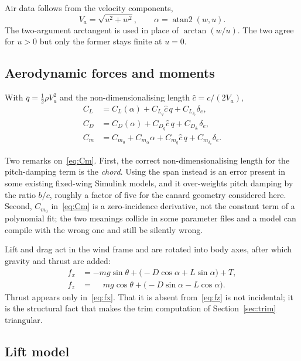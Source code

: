 \documentclass[11pt,a4paper]{article}
\newcommand{\de}{\delta_e}
\begin{document}
Air data follows from the velocity components,
\begin{equation}
  V_a = \sqrt{u^2+w^2}, \qquad \alpha = \operatorname{atan2}(w,u).
  \label{eq:airdata}
\end{equation}
The two-argument arctangent is used in place of $\arctan(w/u)$. The two agree for
$u>0$ but only the former stays finite at $u=0$.

\subsection{Aerodynamic forces and moments}

With $\bar q = \tfrac12\rho V_a^2$ and the non-dimensionalising length
$\hat c = c/(2V_a)$,
\begin{align}
  C_L &= C_{L}(\alpha) + C_{L_q}\hat c\, q + C_{L_{\de}}\de, \label{eq:CL}\\
  C_D &= C_{D}(\alpha) + C_{D_q}\hat c\, q + C_{D_{\de}}\de, \label{eq:CD}\\
  C_m &= C_{m_0} + C_{m_\alpha}\alpha + C_{m_q}\hat c\, q + C_{m_{\de}}\de.
  \label{eq:Cm}
\end{align}

Two remarks on~\eqref{eq:Cm}. First, the correct non-dimensionalising length for
the pitch-damping term is the \emph{chord}. Using the span instead is an error
present in some existing fixed-wing Simulink models, and it over-weights pitch
damping by the ratio $b/c$, roughly a factor of five for the canard geometry
considered here. Second, $C_{m_0}$ in~\eqref{eq:Cm} is a zero-incidence
derivative, not the constant term of a polynomial fit; the two meanings collide
in some parameter files and a model can compile with the wrong one and still be
silently wrong.

Lift and drag act in the wind frame and are rotated into body axes, after which
gravity and thrust are added:
\begin{align}
  f_x &= -mg\sin\theta + \bigl(-D\cos\alpha + L\sin\alpha\bigr) + T,
  \label{eq:fx}\\
  f_z &= \phantom{-}mg\cos\theta + \bigl(-D\sin\alpha - L\cos\alpha\bigr).
  \label{eq:fz}
\end{align}
Thrust appears only in~\eqref{eq:fx}. That it is absent from~\eqref{eq:fz} is not
incidental; it is the structural fact that makes the trim computation of
Section~\ref{sec:trim} triangular.

\subsection{Lift model}
\end{document}
